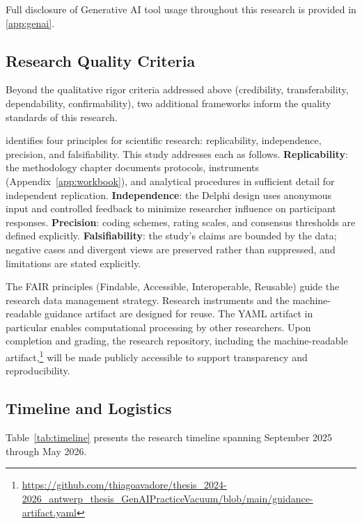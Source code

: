 Full disclosure of Generative AI tool usage throughout this research is provided
in \ref{app:genai}.

\subsection{Research Quality Criteria}

Beyond the qualitative rigor criteria addressed above (credibility,
transferability, dependability, confirmability), two additional frameworks
inform the quality standards of this research.

\textcite{recker_scientific_2021} identifies four principles for scientific
research: replicability, independence, precision, and falsifiability. This
study addresses each as follows. \textbf{Replicability}: the methodology
chapter documents protocols, instruments (Appendix~\ref{app:workbook}), and
analytical procedures in sufficient detail for independent replication.
\textbf{Independence}: the Delphi design uses anonymous input and controlled
feedback to minimize researcher influence on participant responses.
\textbf{Precision}: coding schemes, rating scales, and consensus thresholds
are defined explicitly. \textbf{Falsifiability}: the study's claims are
bounded by the data; negative cases and divergent views are preserved rather
than suppressed, and limitations are stated explicitly.

The FAIR principles \parencite{wilkinson_fair_2016} (Findable, Accessible, Interoperable, Reusable) guide the
research data management strategy. Research instruments and the
machine-readable guidance artifact are designed for reuse. The YAML artifact
in particular enables computational processing by other researchers. Upon
completion and grading, the research repository, including the machine-readable
artifact,\footnote{\url{https://github.com/thiagoavadore/thesis_2024-2026_antwerp_thesis_GenAIPracticeVacuum/blob/main/guidance-artifact.yaml}}
will be made publicly accessible to support transparency and reproducibility.

\subsection{Timeline and Logistics}

Table~\ref{tab:timeline} presents the research timeline spanning September 2025
through May 2026.

